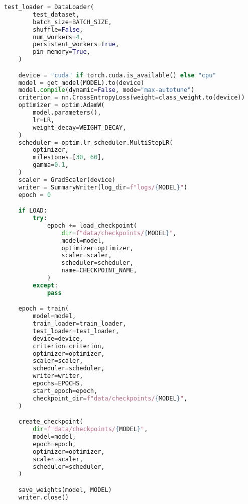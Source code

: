 \begin{lstlisting}[language=python, caption={Файл research.ipynb}, label={listing:research}]
    test_loader = DataLoader(
        test_dataset,
        batch_size=BATCH_SIZE,
        shuffle=False,
        num_workers=4,
        persistent_workers=True,
        pin_memory=True,
    )

    device = "cuda" if torch.cuda.is_available() else "cpu"
    model = get_model(MODEL).to(device)
    model.compile(dynamic=False, mode="max-autotune")
    criterion = nn.CrossEntropyLoss(weight=class_weight.to(device))
    optimizer = optim.AdamW(
        model.parameters(),
        lr=LR,
        weight_decay=WEIGHT_DECAY,
    )
    scheduler = optim.lr_scheduler.MultiStepLR(
        optimizer,
        milestones=[30, 60],
        gamma=0.1,
    )
    scaler = GradScaler(device)
    writer = SummaryWriter(log_dir=f"logs/{MODEL}")
    epoch = 0

    if LOAD:
        try:
            epoch += load_checkpoint(
                dir=f"data/checkpoints/{MODEL}",
                model=model,
                optimizer=optimizer,
                scaler=scaler,
                scheduler=scheduler,
                name=CHECKPOINT_NAME,
            )
        except:
            pass

    epoch = train(
        model=model,
        train_loader=train_loader,
        test_loader=test_loader,
        device=device,
        criterion=criterion,
        optimizer=optimizer,
        scaler=scaler,
        scheduler=scheduler,
        writer=writer,
        epochs=EPOCHS,
        start_epoch=epoch,
        checkpoint_dir=f"data/checkpoints/{MODEL}",
    )

    create_checkpoint(
        dir=f"data/checkpoints/{MODEL}",
        model=model,
        epoch=epoch,
        optimizer=optimizer,
        scaler=scaler,
        scheduler=scheduler,
    )

    save_weights(model, MODEL)
    writer.close()
\end{lstlisting}

